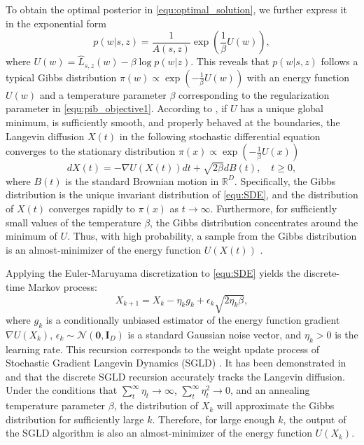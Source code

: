 \documentclass[lettersize,journal]{IEEEtran}
\newcommand{\R}{\mathbb{R}}
\theoremstyle{definition}
\theoremstyle{plain}
\begin{document}
To obtain the optimal posterior in \cref{equ:optimal_solution}, we further express it in the exponential form
\begin{equation}
    p(w|s,z) = \frac{1}{A(s,z)}\exp\left(\frac{1}{\beta} U(w)\right),
\end{equation}
where $U(w) = \hat{L}_{s,z}(w) - \beta \log p(w|z)$. 
This reveals that $p(w|s,z)$ follows a typical Gibbs distribution $\pi(w)\propto \exp\left(-\frac{1}{\beta} U(w)\right)$ with an energy function $U(w)$ and a temperature parameter $\beta$ corresponding to the regularization parameter in \cref{equ:pib_objective1}. 
According to \cite{Gibbs}, if $U$ has a unique global minimum, is sufficiently smooth, and properly behaved at the boundaries, the Langevin diffusion $X(t)$ in the following stochastic differential equation converges to the stationary distribution $\pi(x)\propto \exp\left(-\frac{1}{\beta}U(x)\right)$
\begin{equation}
    \label{equ:SDE}
    dX(t) = -\nabla U(X(t))dt + \sqrt{2\beta}dB(t),\quad t\geq 0,
\end{equation}
where $B(t)$ is the standard Brownian motion in $\R^D$. Specifically, the Gibbs distribution is the unique invariant distribution of \cref{equ:SDE}, and the distribution of $X(t)$ converges rapidly to $\pi(x)$ as $t\to\infty$. 
Furthermore, for sufficiently small values of the temperature $\beta$, the Gibbs distribution concentrates around the minimum of $U$. Thus, with high probability, a sample from the Gibbs distribution is an almost-minimizer of the energy function $U(X(t))$ \cite{almost-minimizer}. 



Applying the Euler-Maruyama discretization \cite{discretization} to \cref{equ:SDE} yields the discrete-time Markov process:
\begin{equation}
    \label{equ:SGLD}
    X_{k+1} = X_k - \eta_k g_k + \epsilon_k\sqrt{2\eta_k \beta} ,
\end{equation}
where $g_k$ is a conditionally unbiased estimator of the energy function gradient $\nabla U(X_k)$, $\epsilon_k\sim \mathcal{N}(\mathbf{0},\mathbf{I}_D)$ is a standard Gaussian noise vector, and $\eta_k>0$ is the learning rate. This recursion corresponds to the weight update process of Stochastic Gradient Langevin Dynamics (SGLD) \cite{SGLD}. It has been demonstrated in \cite{Gibbs-convergence1} and \cite{Gibbs-convergence2} that the discrete SGLD recursion accurately tracks the Langevin diffusion. 
Under the conditions that $\sum_t^\infty \eta_t\to \infty$, $\sum_t^\infty \eta_t^2\to0$, and an annealing temperature parameter $\beta$, the distribution of $X_k$ will approximate the Gibbs distribution for sufficiently large $k$. Therefore, for large enough $k$, the output of the SGLD algorithm is also an almost-minimizer of the energy function $U(X_k)$.
\end{document}
